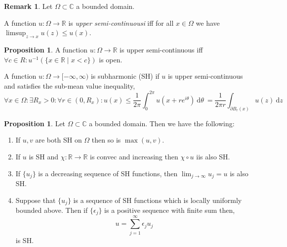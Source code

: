\documentclass[12pt]{extarticle}
\newcommand{\R}{\mathbb{R}}
\newcommand{\C}{\mathbb{C}}
\renewcommand{\d}[1]{\: \mathrm{d}#1 \:}
\theoremstyle{definition}
\newtheorem{proposition}[theorem]{Proposition}
\newtheorem{remark}{Remark}
\newenvironment{definition}[1][Definition:]{\begin{trivlist}
\item[\hskip \labelsep {\bfseries #1}]}{\end{trivlist}}
\begin{document}
\begin{remark}
Let $\Omega \subset \C$ a bounded domain.
\end{remark}

\begin{definition}
A function $u : \Omega \to \R$ is \textit{upper semi-continuousi} iff for all $x \in \Omega$ we have $\limsup_{z \to x} u(z) \le u(x)$. 
\end{definition}

\begin{proposition}
A function $u : \Omega \to \R$ is upper semi-continuous iff $\forall c \in R : u^{-1}(\{ x \in \R \mid x < c \})$ is open. 
\end{proposition}


\begin{definition}
A function $u : \Omega \to [-\infty, \infty)$ is subharmonic (SH) if $u$ is upper semi-continuous and satisfies the sub-mean value inequality,
\[ \forall x \in \Omega : \exists R_x > 0 : \forall r \in (0, R_x) : u(x) \le \frac{1}{2 \pi} \int_0^{2 \pi} u(x + r e^{i \theta}) \d{\theta} = \frac{1}{2 \pi r} \int_{\partial B_r(x)} u(z) \d{z} \]
\end{definition}

\begin{proposition}
Let $\Omega \subset \C$ a bounded domain. Then we have the following:
\begin{enumerate}
\item If $u, v$ are both SH on $\Omega$ then so is $\max{(u,v)}$. 
\item If $u$ is SH and $\chi : \R \to \R$ is convec and increasing then $\chi \circ u$ iis also SH.
\item If $\{ u_j \}$ is a decreasing sequence of SH functions, then $\lim_{j \to \infty} u_j = u$ is also SH.
\item Suppose that $\{ u_j \}$ is a sequence of SH functions which is locally uniformly bounded above. Then if $\{ \epsilon_j \}$ is a positive sequence with finite sum then,
\[ u = \sum_{j = 1}^\infty \epsilon_j u_j \]
is SH.
\end{enumerate}
\end{proposition}
\end{document}
